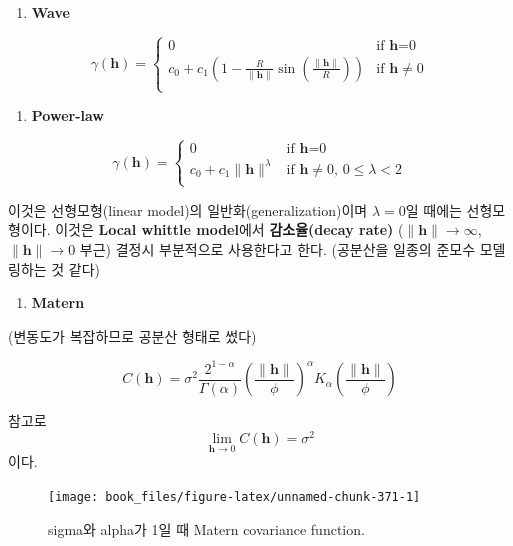 \documentclass[b5paper,]{scrbook}
\providecommand{\tightlist}{%
  \setlength{\itemsep}{0pt}\setlength{\parskip}{0pt}}
\theoremstyle{plain}
\theoremstyle{definition}
\numberwithin{equation}{section}
\begin{document}
\begin{enumerate}
\def\labelenumi{\arabic{enumi}.}
\setcounter{enumi}{6}
\tightlist
\item
  \textbf{Wave}
\end{enumerate}

\[
\gamma(\mathbf{h})= \left\{ \begin{array}{ll}
0 & \textrm{if $\mathbf{h}$=0}\\
c_{0}+c_{1}(1-\frac{R}{\|\mathbf{h}\|}\sin(\frac{\|\mathbf{h}\|}{R})) & \textrm{if $\mathbf{h}\neq 0$}\\
\end{array} \right.
\]

\begin{enumerate}
\def\labelenumi{\arabic{enumi}.}
\setcounter{enumi}{7}
\tightlist
\item
  \textbf{Power-law}
\end{enumerate}

\[
\gamma(\mathbf{h})= \left\{ \begin{array}{ll}
0 & \textrm{if $\mathbf{h}$=0}\\
c_{0}+c_{1}\| \mathbf{h}\|^{\lambda} & \textrm{if $\mathbf{h}\neq 0$, $0\leq \lambda < 2$}\\
\end{array} \right.
\]

이것은 선형모형(linear model)의 일반화(generalization)이며 \(\lambda=0\)일 때에는 선형모형이다. 이것은 \textbf{Local whittle model}에서 \textbf{감소율(decay rate)} (\(\| \mathbf{h} \| \rightarrow \infty\), \(\| \mathbf{h} \| \rightarrow 0\) 부근) 결정시 부분적으로 사용한다고 한다. (공분산을 일종의 준모수 모델링하는 것 같다)

\begin{enumerate}
\def\labelenumi{\arabic{enumi}.}
\setcounter{enumi}{8}
\tightlist
\item
  \textbf{Matern}
\end{enumerate}

(변동도가 복잡하므로 공분산 형태로 썼다)

\[C(\mathbf{h})=\sigma^{2}\frac{2^{1-\alpha}}{\Gamma(\alpha)}(\frac{\|\mathbf{h}\|}{\phi})^{\alpha}K_{\alpha}(\frac{\|\mathbf{h}\|}{\phi})\]

참고로
\[\lim_{\mathbf{h} \rightarrow 0}C(\mathbf{h}) = \sigma^{2}\]
이다.

\begin{figure}

{\centering \texttt{[image: book\_files/figure-latex/unnamed-chunk-371-1]} 

}

\caption{sigma와 alpha가 1일 때 Matern covariance function.}\label{fig:unnamed-chunk-371}
\end{figure}
\end{document}
